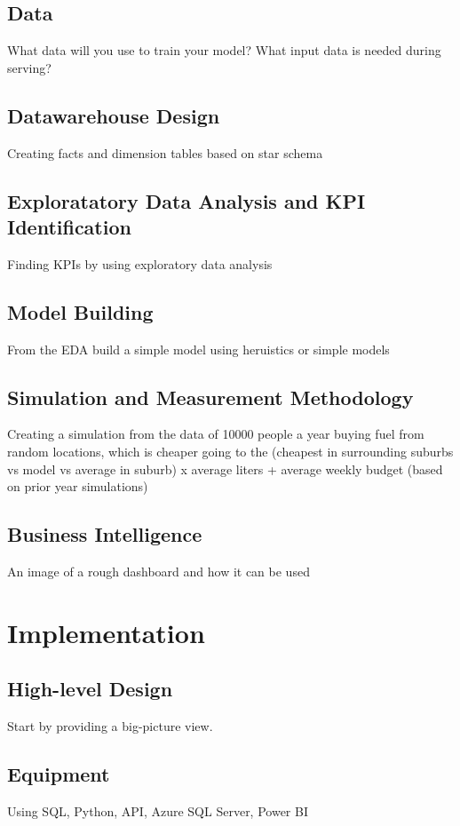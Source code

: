 \documentclass[10pt]{article} %
\begin{document}
\subsection{Data }
What data will you use to train your model? What input data is needed during serving?

\subsection{Datawarehouse Design}
Creating facts and dimension tables based on star schema 

\subsection{Exploratatory Data Analysis and KPI Identification}
Finding KPIs by using exploratory data analysis

\subsection{Model Building}
From the EDA build a simple model using heruistics or simple models

\subsection{Simulation and Measurement Methodology}
Creating a simulation from the data of 10000 people a year buying fuel from random locations, which is cheaper going to the (cheapest in  surrounding suburbs vs model vs average in suburb) x average liters + average weekly budget (based on prior year simulations)

\subsection{Business Intelligence}
An image of a rough dashboard and how it can be used

\section{Implementation}

\subsection{High-level Design}
Start by providing a big-picture view. 

\subsection{Equipment}
Using SQL, Python, API, Azure SQL Server, Power BI
\end{document}
